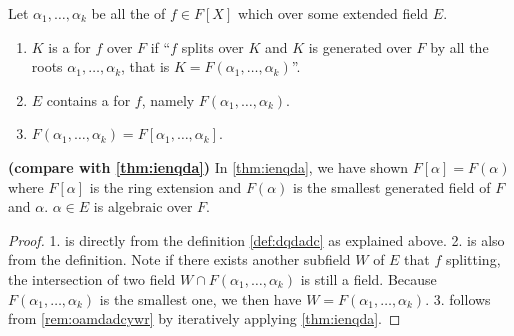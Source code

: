 \documentclass{article}
\newcommand{\bfs}[1]{\textbf{({#1}) }}
\begin{document}
\begin{lema}\label{lem:oandad} Let  $\alpha_{1}, \ldots, \alpha_{k}$ be all the  of $f\in F[X]$ which  over some extended field $E$.
\begin{enumerate}
    \item $K$ is a  for $f$ over $F$ if ``$f$ splits over $K$ and $K$ is generated over $F$ by all the roots $\alpha_{1}, \ldots, \alpha_{k}$, that is $K=F\left(\alpha_{1}, \ldots, \alpha_{k}\right)$''.
    \item  $E$ contains a  for $f$, namely $F\left(\alpha_{1}, \ldots, \alpha_{k}\right)$.
    \item $F\left(\alpha_{1}, \ldots, \alpha_{k}\right)=F\left[\alpha_{1}, \ldots, \alpha_{k}\right]$.
\end{enumerate}
\end{lema}
\begin{rema}\bfs{compare with \cref{thm:ienqda}}\label{rem:oamdadcywr} In \cref{thm:ienqda}, we have shown $F[\alpha]=F(\alpha)$ where $F[\alpha]$ is the ring extension and $F(\alpha)$ is the smallest generated field of $F$ and $\alpha$. $\alpha \in E$ is algebraic over $F$. 
\end{rema}
\begin{proof}
1. is directly from the definition \cref{def:dqdadc} as explained above. 2. is also from the definition. Note if there exists another subfield $W$ of $E$ that $f$ splitting, the intersection of two field $W \cap F\left(\alpha_{1}, \ldots, \alpha_{k}\right)$ is still a field. Because $F\left(\alpha_{1}, \ldots, \alpha_{k}\right)$ is the smallest one, we then have $W=F\left(\alpha_{1}, \ldots, \alpha_{k}\right)$. 3. follows from \cref{rem:oamdadcywr} by iteratively applying \cref{thm:ienqda}.
\end{proof}
\end{document}

